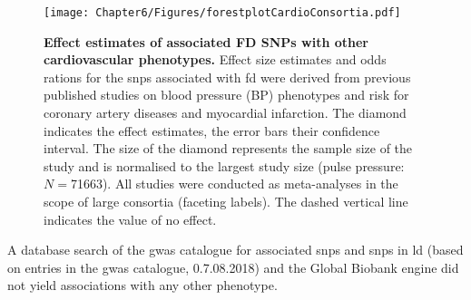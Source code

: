\begin{figure}[hbtp]
	\centering
	\texttt{[image: Chapter6/Figures/forestplotCardioConsortia.pdf]}
	\caption[\textbf{Effect estimates of associated FD SNPs with other cardiovascular phenotypes. }]{\textbf{Effect estimates of associated FD SNPs with other cardiovascular phenotypes. }Effect size estimates and odds rations for the \glspl{snp} associated with \gls{fd} were derived from previous published studies on blood pressure (BP) phenotypes and risk for coronary artery diseases and myocardial infarction. The diamond indicates the effect estimates, the error bars their confidence interval. The size of the diamond represents the sample size of the study and is normalised to the largest study size (pulse pressure: \(N=\)\num{71663}). All studies were conducted as meta-analyses in the scope of large consortia (faceting labels). The dashed vertical line indicates the value of no effect. }
	 	\label{fig:consortia}
\end{figure}
%
A database search of the \gls{gwas} catalogue \citep{MacArthur2017} for associated \glspl{snp} and \glspl{snp} in \gls{ld} (based on entries in the \gls{gwas} catalogue, 0.7.08.2018) and the Global Biobank engine \citep{GBE2017} did not yield associations with any other phenotype. 
